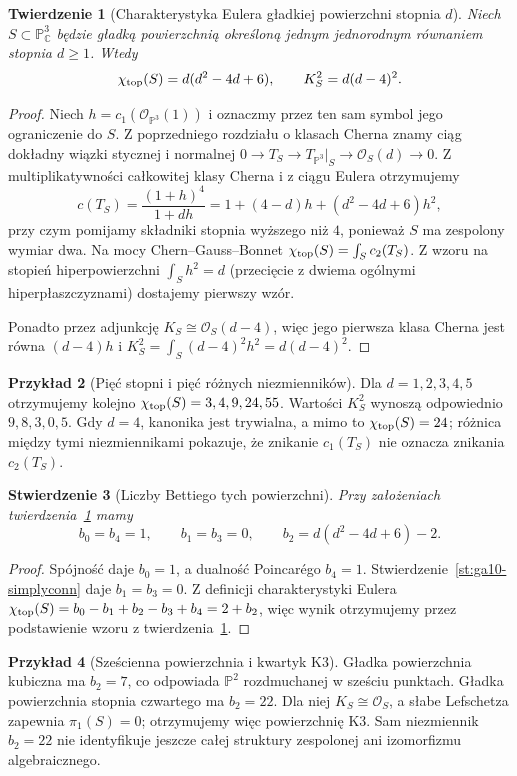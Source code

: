 \documentclass[11pt,a4paper,openany]{report}
\numberwithin{equation}{section}
\theoremstyle{plain}
\newtheorem{twierdzenie}{Twierdzenie}[section]
\newtheorem{stwierdzenie}[twierdzenie]{Stwierdzenie}
\theoremstyle{definition}
\newtheorem{przyklad}[twierdzenie]{Przykład}
\theoremstyle{remark}
\newcommand{\C}{\mathbb C}
\newcommand{\PP}{\mathbb P}
\begin{document}
\begin{twierdzenie}[Charakterystyka Eulera gładkiej powierzchni stopnia $d$]
\label{tw:ga10-surface-euler}
Niech $S\subset\PP^3_\C$ będzie gładką powierzchnią
określoną jednym jednorodnym równaniem stopnia $d\ge1$.
Wtedy
\[
 \chi_{\rm top}(S)=d(d^2-4d+6),\qquad
 K_S^2=d(d-4)^2.
\]
\end{twierdzenie}
\begin{proof}
Niech $h=c_1(\mathcal O_{\PP^3}(1))$ i oznaczmy przez ten sam
symbol jego ograniczenie do $S$.
Z poprzedniego rozdziału o klasach Cherna znamy ciąg dokładny
wiązki stycznej i normalnej
$0\to T_S\to T_{\PP^3}|_S\to\mathcal O_S(d)\to0$.
Z multiplikatywności całkowitej klasy Cherna i z ciągu Eulera
otrzymujemy
\[
 c(T_S)=\frac{(1+h)^4}{1+dh}
 =1+(4-d)h+(d^2-4d+6)h^2,
\]
przy czym pomijamy składniki stopnia wyższego niż $4$,
ponieważ $S$ ma zespolony wymiar dwa.
Na mocy Chern--Gauss--Bonnet
$\chi_{\rm top}(S)=\int_S c_2(T_S)$.
Z wzoru na stopień hiperpowierzchni
$\int_S h^2=d$ (przecięcie z dwiema ogólnymi
hiperpłaszczyznami) dostajemy pierwszy wzór.

Ponadto przez adjunkcję
$K_S\cong\mathcal O_S(d-4)$, więc jego pierwsza
klasa Cherna jest równa $(d-4)h$ i
$K_S^2=\int_S (d-4)^2h^2=d(d-4)^2$.
\end{proof}

\begin{przyklad}[Pięć stopni i pięć różnych niezmienników]
Dla $d=1,2,3,4,5$ otrzymujemy kolejno
$\chi_{\rm top}(S)=3,4,9,24,55$.
Wartości $K_S^2$ wynoszą odpowiednio $9,8,3,0,5$.
Gdy $d=4$, kanonika jest trywialna, a mimo to
$\chi_{\rm top}(S)=24$; różnica między tymi niezmiennikami
pokazuje, że znikanie $c_1(T_S)$ nie oznacza znikania
$c_2(T_S)$.
\end{przyklad}

\begin{stwierdzenie}[Liczby Bettiego tych powierzchni]
\label{st:ga10-betti}
Przy założeniach twierdzenia~\ref{tw:ga10-surface-euler} mamy
\[
 b_0=b_4=1,\qquad b_1=b_3=0,\qquad
 b_2=d(d^2-4d+6)-2.
\]
\end{stwierdzenie}
\begin{proof}
Spójność daje $b_0=1$, a dualność Poincarégo $b_4=1$.
Stwierdzenie~\ref{st:ga10-simplyconn} daje $b_1=b_3=0$.
Z definicji charakterystyki Eulera
$\chi_{\rm top}(S)=b_0-b_1+b_2-b_3+b_4=2+b_2$,
więc wynik otrzymujemy przez podstawienie
wzoru z twierdzenia~\ref{tw:ga10-surface-euler}.
\end{proof}

\begin{przyklad}[Sześcienna powierzchnia i kwartyk K3]
Gładka powierzchnia kubiczna ma $b_2=7$,
co odpowiada $\PP^2$ rozdmuchanej w sześciu punktach.
Gładka powierzchnia stopnia czwartego ma $b_2=22$.
Dla niej $K_S\cong\mathcal O_S$, a słabe Lefschetza
zapewnia $\pi_1(S)=0$; otrzymujemy więc powierzchnię K3.
Sam niezmiennik $b_2=22$ nie identyfikuje jeszcze całej
struktury zespolonej ani izomorfizmu algebraicznego.
\end{przyklad}
\end{document}
